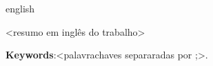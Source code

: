 \begin{resumo}[Abstract]
 \begin{otherlanguage*}{english}

\textless resumo em inglês do trabalho\textgreater
   \vspace{\onelineskip}

   \noindent
   \textbf{Keywords}:\textless palavrachaves separaradas por ;\textgreater.
 \end{otherlanguage*}
\end{resumo} 
